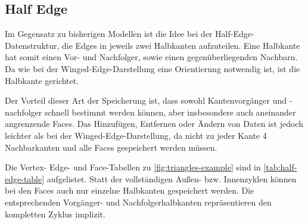 \subsection{Half Edge}
\label{subsec:half-edge}

Im Gegensatz zu bisherigen Modellen ist die Idee bei der Half-Edge-Datenstruktur, die Edges in jeweils zwei Halbkanten aufzuteilen.
Eine Halbkante hat somit einen Vor- und Nachfolger, sowie einen gegenüberliegenden Nachbarn.
Da wie bei der Winged-Edge-Darstellung eine Orientierung notwendig ist, ist die Halbkante gerichtet.

Der Vorteil dieser Art der Speicherung ist, dass sowohl Kantenvorgänger und -nachfolger schnell bestimmt werden können, aber insbesondere auch aneinander angrenzende Faces. Das Hinzufügen, Entfernen oder Ändern von Daten ist jedoch leichter als bei der Winged-Edge-Darstellung, da nicht zu jeder Kante 4 Nachbarkanten und alle Faces gespeichert werden müssen.

Die Vertex- Edge- und Face-Tabellen zu \autoref{fig:triangles-example} sind in \autoref{tab:half-edge-table} aufgelistet. Statt der vollständigen Außen- bzw. Innenzyklen können bei den Faces auch nur einzelne Halbkanten gespeichert werden. Die entsprechenden Vorgänger- und Nachfolgerhalbkanten repräsentieren den kompletten Zyklus implizit.

